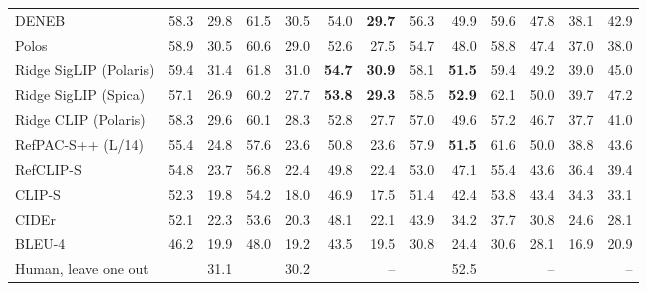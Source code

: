\begin{tabular}{lr@{\hspace{3pt}}rr@{\hspace{3pt}}rr@{\hspace{3pt}}rr@{\hspace{3pt}}rr@{\hspace{3pt}}rr@{\hspace{3pt}}r}
DENEB & 58.3 & 29.8 & 61.5 & 30.5 & 54.0 & \textbf{29.7} & 56.3 & 49.9 & 59.6 & 47.8 & 38.1 & 42.9 \\
Polos & 58.9 & 30.5 & 60.6 & 29.0 & 52.6 & 27.5 & 54.7 & 48.0 & 58.8 & 47.4 & 37.0 & 38.0 \\
\addlinespace
Ridge SigLIP (Polaris) & 59.4 & 31.4 & 61.8 & 31.0 & \textbf{54.7} & \textbf{30.9} & 58.1 & \textbf{51.5} & 59.4 & 49.2 & 39.0 & 45.0 \\
Ridge SigLIP (Spica) & 57.1 & 26.9 & 60.2 & 27.7 & \textbf{53.8} & \textbf{29.3} & 58.5 & \textbf{52.9} & 62.1 & 50.0 & 39.7 & 47.2 \\
Ridge CLIP (Polaris) & 58.3 & 29.6 & 60.1 & 28.3 & 52.8 & 27.7 & 57.0 & 49.6 & 57.2 & 46.7 & 37.7 & 41.0 \\
\addlinespace
RefPAC-S++ (L/14) & 55.4 & 24.8 & 57.6 & 23.6 & 50.8 & 23.6 & 57.9 & \textbf{51.5} & 61.6 & 50.0 & 38.8 & 43.6 \\
RefCLIP-S & 54.8 & 23.7 & 56.8 & 22.4 & 49.8 & 22.4 & 53.0 & 47.1 & 55.4 & 43.6 & 36.4 & 39.4 \\
CLIP-S & 52.3 & 19.8 & 54.2 & 18.0 & 46.9 & 17.5 & 51.4 & 42.4 & 53.8 & 43.4 & 34.3 & 33.1 \\
CIDEr & 52.1 & 22.3 & 53.6 & 20.3 & 48.1 & 22.1 & 43.9 & 34.2 & 37.7 & 30.8 & 24.6 & 28.1 \\
BLEU-4 & 46.2 & 19.9 & 48.0 & 19.2 & 43.5 & 19.5 & 30.8 & 24.4 & 30.6 & 28.1 & 16.9 & 20.9 \\
\midrule
Human, leave one out &  & 31.1 &  & 30.2 &  & -- &  & 52.5 &  & -- &  & -- \\
\bottomrule
\end{tabular}
